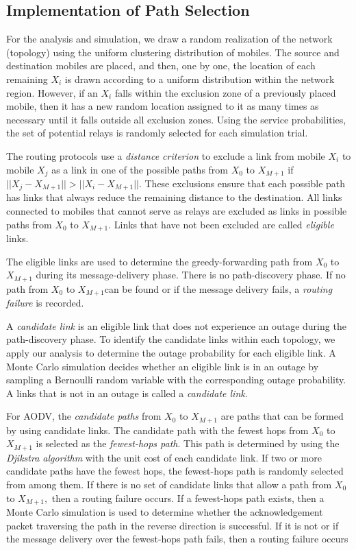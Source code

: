 \documentclass[conference]{IEEEtran}
\begin{document}
\subsection{Implementation of Path Selection}

For the analysis and simulation, we draw a random
realization of the network (topology) using the uniform clustering distribution of mobiles. The source and
destination mobiles are placed, and then, one by one,
the location of each remaining
$X_i$ is drawn according to a uniform distribution within the network region. However, if an
$X_i$ falls within the exclusion zone of
a previously placed mobile, then it has a new random
location assigned to it as many times as necessary until
it falls outside all exclusion zones. Using the service
probabilities, the set of potential relays is randomly
selected for each simulation trial.

The routing protocols use a \emph{distance criterion} to exclude a link from
mobile $X_{i}$ to mobile $X_{j}$ as a link in one of the possible paths from
$X_{0}$ to $X_{M+1}$ if $||X_{j}-X_{M+1}||>||X_{i}-X_{M+1}||$. These
exclusions ensure that each possible path has links that always
reduce the remaining distance to the destination. All links connected to mobiles that cannot serve as relays are
excluded as links in possible paths from $X_{0}$ to $X_{M+1}.$ Links that have
not been excluded are called \emph{eligible} links.

The eligible links are used to determine the greedy-forwarding path from
$X_0$ to $X_{M+1}$
during its message-delivery phase. There is no path-discovery phase. If no
path from $X_0$ to $X_{M+1}$can be found or if the message
delivery fails, a \emph{routing failure} is recorded.

A \emph{candidate link} is an eligible link that does not experience an outage during the path-discovery phase. To identify the candidate links within each topology, we apply our analysis to determine the outage probability for each eligible link. A Monte Carlo simulation decides
whether an eligible link is in an outage by sampling a
Bernoulli random variable with the corresponding outage
probability. A links that is not in an outage is called a
\emph{candidate link}.

For AODV, the \emph{candidate paths} from $X_{0}$ to $X_{M+1}$ are paths that
can be formed by using candidate links. The candidate path with the fewest hops from $X_{0}$ to $X_{M+1}$
is selected as the
\emph{fewest-hops path}. This path is
determined by using the
\emph{Djikstra algorithm}
\cite{bru} with the
unit cost of each candidate link. If two or more candidate
paths have the fewest hops, the fewest-hops path is
randomly selected from among them. If there is no set
of candidate links that allow a path from
$X_{0}$ to $X_{M+1},$
then a routing failure occurs. If a fewest-hops path exists,
then a Monte Carlo simulation is used to determine
whether the acknowledgement packet traversing the path
in the reverse direction is successful. If it is not or if the
message delivery over the fewest-hops path fails, then a
routing failure occurs
\end{document}
